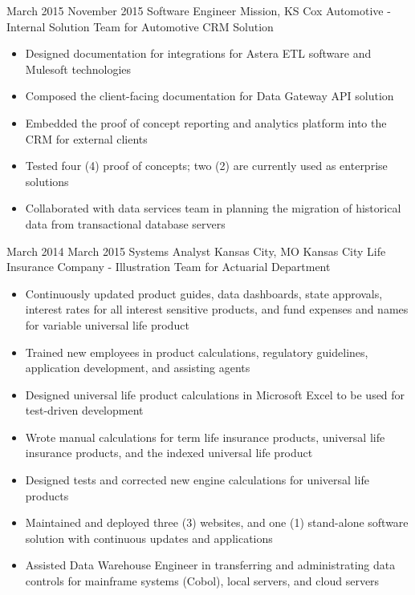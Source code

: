 \vspace*{0.1 in}

\Experience
{March 2015}
{November 2015}
{Software Engineer}
{Mission, KS}
{Cox Automotive - Internal Solution Team for Automotive CRM Solution}
{
    \begin{itemize}
        \item Designed documentation for integrations for Astera ETL software
        and Mulesoft technologies
        \item Composed the client-facing documentation for Data Gateway API
        solution
        \item Embedded the proof of concept reporting and analytics platform
        into the CRM for external clients
        \item Tested four (4) proof of concepts; two (2) are currently used as
        enterprise solutions
        \item Collaborated with data services team in planning the migration of
        historical data from transactional database servers
    \end{itemize}
}

\vspace*{0.1 in}

\Experience
{March 2014}
{March 2015}
{Systems Analyst}
{Kansas City, MO}
{Kansas City Life Insurance Company - Illustration Team for Actuarial Department}
{
    \begin{itemize}
        \item Continuously updated product guides, data dashboards, state
        approvals, interest rates for all interest sensitive products, and fund
        expenses and names for variable universal life product
        \item Trained new employees in product calculations, regulatory
        guidelines, application development, and assisting agents
        \item Designed universal life product calculations in Microsoft Excel to
        be used for test-driven development
        \item Wrote manual calculations for term life insurance products,
        universal life insurance products, and the indexed universal life
        product
        \item Designed tests and corrected new engine calculations for universal
        life products
        \item Maintained and deployed three (3) websites, and one (1)
        stand-alone software solution with continuous updates and applications
        \item Assisted Data Warehouse Engineer in transferring and
        administrating data controls for mainframe systems (Cobol), local
        servers, and cloud servers
    \end{itemize}
}

